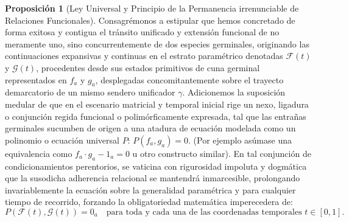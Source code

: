 \documentclass[11pt,a4paper]{article}
\theoremstyle{definition}
\newtheorem{proposicion}{Proposición}[section]
\theoremstyle{remark}
\numberwithin{equation}{section}
\begin{document}
\begin{proposicion}[Ley Universal y Principio de la Permanencia irrenunciable de Relaciones Funcionales]
Consagrémonos a estipular que hemos concretado de forma exitosa y contigua el tránsito unificado y extensión funcional de no meramente uno, sino concurrentemente de dos especies germinales, originando las continuaciones expansivas y continuas en el estrato paramétrico denotadas $\mathcal{F}(t)$ y $\mathcal{G}(t)$, procedentes desde sus estados primitivos de cuna germinal representados en $f_a$ y $g_a$, desplegadas concomitantemente sobre el trayecto demarcatorio de un mismo sendero unificador $\gamma$.
Adicionemos la suposición medular de que en el escenario matricial y temporal inicial rige un nexo, ligadura o conjunción regida funcional o polimórficamente expresada, tal que las entrañas germinales sucumben de origen a una atadura de ecuación modelada como un polinomio o ecuación universal $P$: $P(f_a, g_a) = 0$. (Por ejemplo asúmase una equivalencia como $f_a \cdot g_a - 1_a = 0$ u otro constructo similar).
En tal conjunción de condicionamientos perentorios, se vaticina con rigurosidad impoluta y dogmática que la susodicha adherencia relacional se mantendrá inmarcesible, prolongando invariablemente la ecuación sobre la generalidad paramétrica y para cualquier tiempo de recorrido, forzando la obligatoriedad matemática imperecedera de:
\begin{equation}
P(\mathcal{F}(t), \mathcal{G}(t)) = 0_a \quad \text{para toda y cada una de las coordenadas temporales } t \in [0, 1].
\end{equation}
\end{proposicion}
\end{document}
